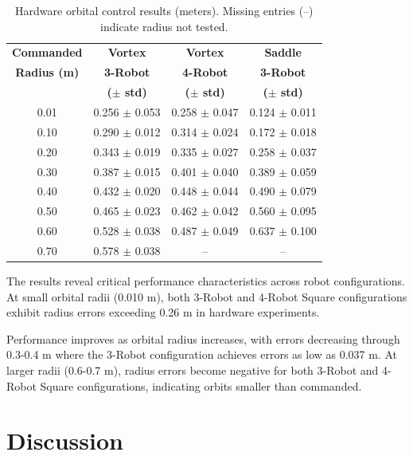 \documentclass[lettersize,journal]{IEEEtran}
\begin{document}
\begin{table}[!t]
    \centering
    \caption{Hardware orbital control results (meters). Missing entries (--) indicate radius not tested.}
    \label{tab:orbital_radius_comparison}
    \begin{tabular}{cccc}
    \hline
    \textbf{Commanded} & \textbf{Vortex} & \textbf{Vortex} & \textbf{Saddle} \\
    \textbf{Radius (m)} & \textbf{3-Robot} & \textbf{4-Robot} & \textbf{3-Robot} \\
     & \textbf{($\pm$ std)} & \textbf{($\pm$ std)} & \textbf{($\pm$ std)} \\
    \hline
    0.01 & 0.256 $\pm$ 0.053 & 0.258 $\pm$ 0.047 & 0.124 $\pm$ 0.011 \\
    0.10 & 0.290 $\pm$ 0.012 & 0.314 $\pm$ 0.024 & 0.172 $\pm$ 0.018 \\
    0.20 & 0.343 $\pm$ 0.019 & 0.335 $\pm$ 0.027 & 0.258 $\pm$ 0.037 \\
    0.30 & 0.387 $\pm$ 0.015 & 0.401 $\pm$ 0.040 & 0.389 $\pm$ 0.059 \\
    0.40 & 0.432 $\pm$ 0.020 & 0.448 $\pm$ 0.044 & 0.490 $\pm$ 0.079 \\
    0.50 & 0.465 $\pm$ 0.023 & 0.462 $\pm$ 0.042 & 0.560 $\pm$ 0.095 \\
    0.60 & 0.528 $\pm$ 0.038 & 0.487 $\pm$ 0.049 & 0.637 $\pm$ 0.100 \\
    0.70 & 0.578 $\pm$ 0.038 & -- & -- \\
    \hline
    \end{tabular}
    \end{table}




The results reveal critical performance characteristics across robot configurations. At small orbital radii (0.010 m), both 3-Robot and 4-Robot Square configurations exhibit radius errors exceeding 0.26 m in hardware experiments.

Performance improves as orbital radius increases, with errors decreasing through 0.3-0.4 m where the 3-Robot configuration achieves errors as low as 0.037 m. At larger radii (0.6-0.7 m), radius errors become negative for both 3-Robot and 4-Robot Square configurations, indicating orbits smaller than commanded.




\section{Discussion}
\end{document}
